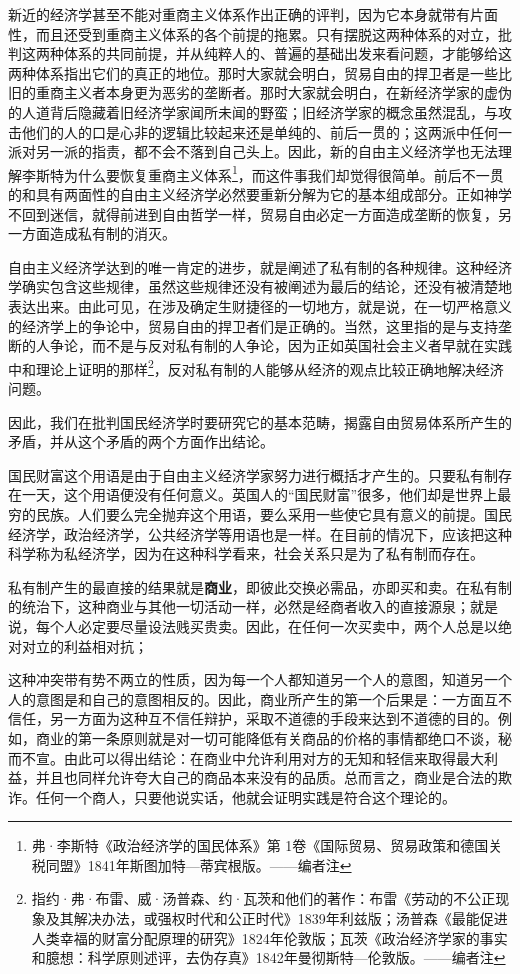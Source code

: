 \documentclass[a4paper,twoside,12pt,AutoFakeBold]{ctexart}
\begin{document}
新近的经济学甚至不能对重商主义体系作出正确的评判，因为它本身就带有片面性，而且还受到重商主义体系的各个前提的拖累。只有摆脱这两种体系的对立，批判这两种体系的共同前提，并从纯粹人的、普遍的基础出发来看问题，才能够给这两种体系指出它们的真正的地位。那时大家就会明白，贸易自由的捍卫者是一些比旧的重商主义者本身更为恶劣的垄断者。那时大家就会明白，在新经济学家的虚伪的人道背后隐藏着旧经济学家闻所未闻的野蛮；旧经济学家的概念虽然混乱，与攻击他们的人的口是心非的逻辑比较起来还是单纯的、前后一贯的；这两派中任何一派对另一派的指责，都不会不落到自己头上。因此，新的自由主义经济学也无法理解李斯特为什么要恢复重商主义体系\footnote{弗·李斯特《政治经济学的国民体系》第 1卷《国际贸易、贸易政策和德国关税同盟》1841年斯图加特—蒂宾根版。——编者注}，而这件事我们却觉得很简单。前后不一贯的和具有两面性的自由主义经济学必然要重新分解为它的基本组成部分。正如神学不回到迷信，就得前进到自由哲学一样，贸易自由必定一方面造成垄断的恢复，另一方面造成私有制的消灭。

自由主义经济学达到的唯一肯定的进步，就是阐述了私有制的各种规律。这种经济学确实包含这些规律，虽然这些规律还没有被阐述为最后的结论，还没有被清楚地表达出来。由此可见，在涉及确定生财捷径的一切地方，就是说，在一切严格意义的经济学上的争论中，贸易自由的捍卫者们是正确的。当然，这里指的是与支持垄断的人争论，而不是与反对私有制的人争论，因为正如英国社会主义者早就在实践中和理论上证明的那样\footnote{指约·弗·布雷、威·汤普森、约·瓦茨和他们的著作：布雷《劳动的不公正现象及其解决办法，或强权时代和公正时代》1839年利兹版；汤普森《最能促进人类幸福的财富分配原理的研究》1824年伦敦版；瓦茨《政治经济学家的事实和臆想：科学原则述评，去伪存真》1842年曼彻斯特—伦敦版。——编者注}，反对私有制的人能够从经济的观点比较正确地解决经济问题。

因此，我们在批判国民经济学时要研究它的基本范畴，揭露自由贸易体系所产生的矛盾，并从这个矛盾的两个方面作出结论。 

国民财富这个用语是由于自由主义经济学家努力进行概括才产生的。只要私有制存在一天，这个用语便没有任何意义。英国人的“国民财富”很多，他们却是世界上最穷的民族。人们要么完全抛弃这个用语，要么采用一些使它具有意义的前提。国民经济学，政治经济学，公共经济学等用语也是一样。在目前的情况下，应该把这种科学称为私经济学，因为在这种科学看来，社会关系只是为了私有制而存在。 

私有制产生的最直接的结果就是\textbf{商业}，即彼此交换必需品，亦即买和卖。在私有制的统治下，这种商业与其他一切活动一样，必然是经商者收入的直接源泉；就是说，每个人必定要尽量设法贱买贵卖。因此，在任何一次买卖中，两个人总是以绝对对立的利益相对抗；

这种冲突带有势不两立的性质，因为每一个人都知道另一个人的意图，知道另一个人的意图是和自己的意图相反的。因此，商业所产生的第一个后果是：一方面互不信任，另一方面为这种互不信任辩护，采取不道德的手段来达到不道德的目的。例如，商业的第一条原则就是对一切可能降低有关商品的价格的事情都绝口不谈，秘而不宣。由此可以得出结论：在商业中允许利用对方的无知和轻信来取得最大利益，并且也同样允许夸大自己的商品本来没有的品质。总而言之，商业是合法的欺诈。任何一个商人，只要他说实话，他就会证明实践是符合这个理论的。
\end{document}
